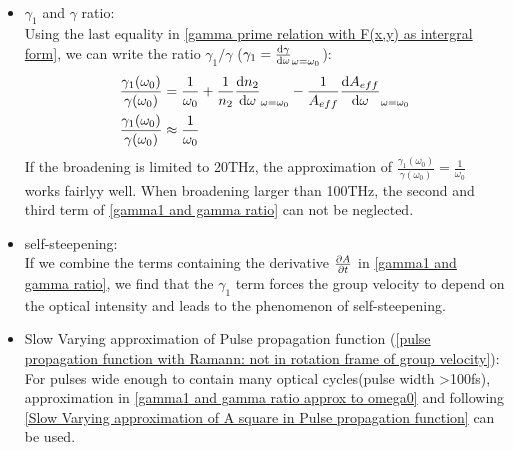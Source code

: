 \documentclass[12pt]{extarticle}
\numberwithin{equation}{section}
\numberwithin{figure}{section}
\numberwithin{table}{section}
\newcommand{\<}{\langle}
\renewcommand{\>}{\rangle}
\theoremstyle{definition}
\begin{document}
\begin{itemize}
\begin{equation}
\begin{split}
                \end{split}
                    \label{pulse propagation function with Ramann as well as alpha dispersion: not in rotation frame of group velocity}
                \end{equation}
            \item $\gamma_1$ and $\gamma$ ratio:\\
                Using the last equality in \autoref{gamma prime relation with F(x,y) as intergral form}, we can write the ratio $\gamma_1/\gamma$ ($\gamma_1=\dv{\gamma}{\omega}_{\omega=\omega_0}$):
                \begin{subequations}
                \begin{align}
                    \frac{\gamma_1(\omega_0)}{\gamma(\omega_0)}            &=\frac{1}{\omega_0}+\frac{1}{n_2}\dv{n_2}{\omega}_{\omega=\omega_0}-\frac{1}{A_{eff}}\dv{A_{eff}}{\omega}_{\omega=\omega_0}\\
                    \frac{\gamma_1(\omega_0)}{\gamma(\omega_0)} &\approx\frac{1}{\omega_0}\label{gamma1 and gamma ratio approx to omega0}
                \end{align}
                        \label{gamma1 and gamma ratio}
                \end{subequations}
                If the broadening is limited to 20THz, the approximation of $\frac{\gamma_1(\omega_0)}{\gamma(\omega_0)}=\frac{1}{\omega_0}$ works fairlyy well. When broadening larger than 100THz, the second and third term of \autoref{gamma1 and gamma ratio} can not be neglected.
            \item self-steepening:\\
                If we combine the terms containing the derivative $\pdv{A}{t}$ in \autoref{gamma1 and gamma ratio}, we find that the $\gamma_1$ term forces the group velocity to depend on the optical intensity and leads to the phenomenon of self-steepening.
            \item Slow Varying approximation of Pulse propagation function (\autoref{pulse propagation function with Ramann: not in rotation frame of group velocity}):\\
                For pulses wide enough to contain many optical cycles(pulse width >100fs), approximation in \autoref{gamma1 and gamma ratio approx to omega0} and following \autoref{Slow Varying approximation of A square in Pulse propagation function} can be used.
                \begin{subequations}
                \begin{align}

\end{align}
\end{subequations}
\end{itemize}
\end{document}
